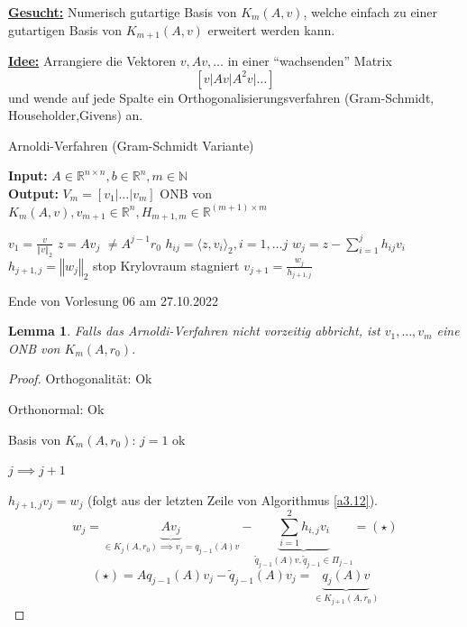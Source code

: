\documentclass{book}
\newtheorem{lemma}[algorithm]{Lemma}
\def\R{\mathbb{R}}
\def\N{\mathbb{N}}
\begin{document}
            \underline{\textbf{Gesucht:}} Numerisch gutartige Basis von $K_m(A,v)$, welche einfach zu einer gutartigen Basis von $K_{m+1}(A,v)$ erweitert werden kann.

            \underline{\textbf{Idee:}} Arrangiere die Vektoren $v,Av,\dots$ in einer ``wachsenden'' Matrix
            \[[v\vert Av\vert A^2v\vert \dots]\]
            und wende auf jede Spalte ein Orthogonalisierungsverfahren (Gram-Schmidt, Householder,Givens) an.

            \begin{algorithm}[H]
                \caption{Arnoldi-Verfahren (Gram-Schmidt Variante)}\label{a3.12}
                \textbf{Input:} $A\in\R^{n\times n},b\in\R^n,m\in\N$\\
                \textbf{Output:} $V_m=[v_1\vert \dots\vert v_m]$ ONB von $K_m(A,v),v_{m+1}\in\R^n,H_{m+1,m}\in\R^{(m+1)\times m}$
                \begin{algorithmic}
                \State $v_1=\frac{v}{\left\Vert v \right\Vert_2}$
                    \State $z=Av_j$ \Comment $\neq A^{j-1}r_0$
                    \State $h_{ij}=\langle z,v_i \rangle_2,i=1,\dots j$
                    \State $w_j=z-\sum_{i=1}^j h_{ij}v_i$
                    \State $h_{j+1,j}=\left\Vert w_j \right\Vert_2$
                        \State stop \Comment Krylovraum stagniert
                    \EndIf
                \State $v_{j+1}=\frac{w_j}{h_{j+1,j}}$
                \EndFor
                \end{algorithmic}
            \end{algorithm}

            \noindent
            \xrfill[0.7ex]{1pt}Ende von Vorlesung 06 am 27.10.2022\xrfill[0.7ex]{1pt}

            \begin{lemma}\label{l3.13}
                Falls das Arnoldi-Verfahren nicht vorzeitig abbricht, ist $v_1,\dots,v_m$ eine 
                ONB von $K_m(A,r_0)$.
            \end{lemma}
            \begin{proof}
                Orthogonalität: Ok

                Orthonormal: Ok

                Basis von $K_m(A,r_0)$: $j=1$ ok

                $j\implies j+1$

                $h_{j+1,j}v_j = w_j$ (folgt aus der letzten Zeile von Algorithmus \ref{a3.12}).
                \[
                    w_j=\underbrace{Av_j}_{\in K_j(A,r_0)\implies v_j=q_{j-1}(A)v}-\underbrace{\sum_{i=1}^2h_{i,j}v_i}_{\tilde{q}_{j-1}(A)v, \tilde{q}_{j-1}\in \Pi_{j-1}}  = (\star)
                \]
                \[
                    (\star) = Aq_{j-1}(A)v_j - \tilde{q}_{j-1}(A)v_j=\underbrace{q_{j}(A)v}_{\in K_{j+1}(A,r_0)}    
                \]
            \end{proof}
\end{document}
